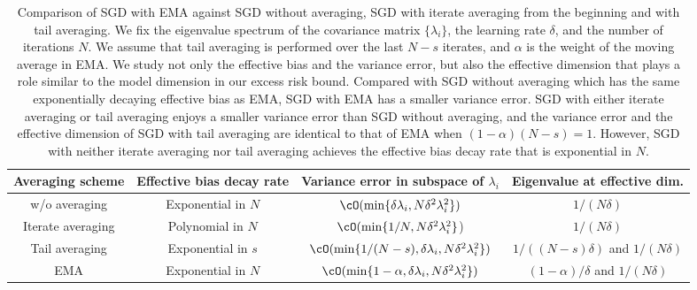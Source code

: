 \documentclass[11pt]{article}
\begin{document}
\begin{table}[ht]
\footnotesize
\centering
\caption{Comparison of SGD with EMA against SGD without averaging, SGD with iterate averaging from the beginning and with tail averaging. We fix the eigenvalue spectrum of the covariance matrix $\{\lambda_i\}$, the learning rate $\delta$, and the number of iterations $N$. We assume that tail averaging is performed over the last $N-s$ iterates, and $\alpha$ is the weight of the moving average in EMA. We study not only the effective bias and the variance error, but also the effective dimension that plays a role similar to the model dimension in our excess risk bound. Compared with SGD without averaging which has the same exponentially decaying effective bias as EMA, SGD with EMA has a smaller variance error. SGD with either iterate averaging or tail averaging enjoys a smaller variance error than SGD without averaging, and the variance error and the effective dimension of SGD with tail averaging are identical to that of EMA when $(1-\alpha)(N-s)=1$. However, SGD with neither iterate averaging nor tail averaging achieves the effective bias decay rate that is exponential in $N$.}\label{table:comparison}
\begin{tabular}{cccc}
\toprule
Averaging scheme & Effective bias decay rate & Variance error in subspace of $\lambda_i$ & Eigenvalue at effective dim.\\
\midrule
w/o averaging & Exponential in $N$ & $\cO(\min\{\delta\lambda_i, N\delta^2\lambda_i^2\})$ & $1/(N\delta)$\\
Iterate averaging & Polynomial in $N$ & $\cO(\min\{1/N, N\delta^2\lambda_i^2\}$) & $1/(N\delta)$\\
Tail averaging & Exponential in $s$ & $\cO(\min\{1/(N-s), \delta\lambda_i, N\delta^2\lambda_i^2\})$ & $1/((N-s)\delta)$ and $1/(N\delta)$\\
\rowcolor{LightCyan!40!}EMA & Exponential in $N$ & $\cO(\min\{1-\alpha, \delta\lambda_i, N\delta^2\lambda_i^2\})$ & $(1-\alpha)/\delta$ and $1/(N\delta)$\\
\bottomrule
\end{tabular}
\end{table}
\end{document}
